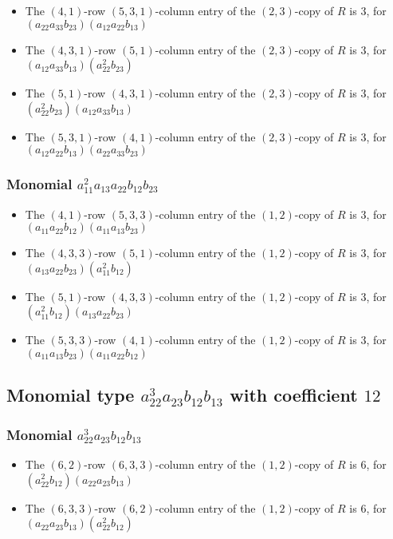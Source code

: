 \documentclass{article}
\begin{document}
\begin{itemize}
\item The $(4, 1)$-row $(5, 3, 1)$-column entry of the $ \left(2, 3\right) $-copy of $R$ is $ 3 $, for $( a_{22} a_{33} b_{23} )( a_{12} a_{22} b_{13} )$ 
\item The $(4, 3, 1)$-row $(5, 1)$-column entry of the $ \left(2, 3\right) $-copy of $R$ is $ 3 $, for $( a_{12} a_{33} b_{13} )( a_{22}^{2} b_{23} )$ 
\item The $(5, 1)$-row $(4, 3, 1)$-column entry of the $ \left(2, 3\right) $-copy of $R$ is $ 3 $, for $( a_{22}^{2} b_{23} )( a_{12} a_{33} b_{13} )$ 
\item The $(5, 3, 1)$-row $(4, 1)$-column entry of the $ \left(2, 3\right) $-copy of $R$ is $ 3 $, for $( a_{12} a_{22} b_{13} )( a_{22} a_{33} b_{23} )$ 
\end{itemize}
\subsubsection{Monomial $ a_{11}^{2} a_{13} a_{22} b_{12} b_{23} $}

\begin{itemize}
\item The $(4, 1)$-row $(5, 3, 3)$-column entry of the $ \left(1, 2\right) $-copy of $R$ is $ 3 $, for $( a_{11} a_{22} b_{12} )( a_{11} a_{13} b_{23} )$ 
\item The $(4, 3, 3)$-row $(5, 1)$-column entry of the $ \left(1, 2\right) $-copy of $R$ is $ 3 $, for $( a_{13} a_{22} b_{23} )( a_{11}^{2} b_{12} )$ 
\item The $(5, 1)$-row $(4, 3, 3)$-column entry of the $ \left(1, 2\right) $-copy of $R$ is $ 3 $, for $( a_{11}^{2} b_{12} )( a_{13} a_{22} b_{23} )$ 
\item The $(5, 3, 3)$-row $(4, 1)$-column entry of the $ \left(1, 2\right) $-copy of $R$ is $ 3 $, for $( a_{11} a_{13} b_{23} )( a_{11} a_{22} b_{12} )$ 
\end{itemize}
\subsection{Monomial type $ a_{22}^{3} a_{23} b_{12} b_{13} $ with coefficient $ 12 $}

\subsubsection{Monomial $ a_{22}^{3} a_{23} b_{12} b_{13} $}

\begin{itemize}
\item The $(6, 2)$-row $(6, 3, 3)$-column entry of the $ \left(1, 2\right) $-copy of $R$ is $ 6 $, for $( a_{22}^{2} b_{12} )( a_{22} a_{23} b_{13} )$ 
\item The $(6, 3, 3)$-row $(6, 2)$-column entry of the $ \left(1, 2\right) $-copy of $R$ is $ 6 $, for $( a_{22} a_{23} b_{13} )( a_{22}^{2} b_{12} )$ 
\end{itemize}
\end{document}

